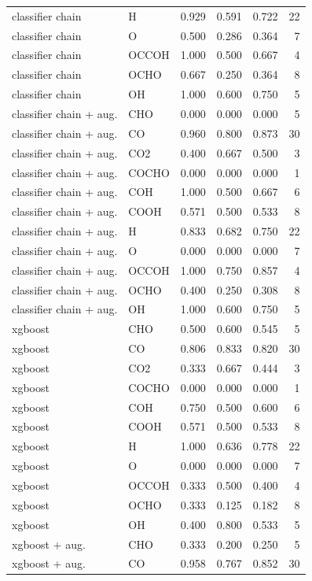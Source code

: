\begin{longtable}{llrrrr}
classifier chain & H & 0.929 & 0.591 & 0.722 & 22\\
classifier chain & O & 0.500 & 0.286 & 0.364 & 7\\
classifier chain & OCCOH & 1.000 & 0.500 & 0.667 & 4\\
classifier chain & OCHO & 0.667 & 0.250 & 0.364 & 8\\
classifier chain & OH & 1.000 & 0.600 & 0.750 & 5\\
classifier chain + aug. & CHO & 0.000 & 0.000 & 0.000 & 5\\
classifier chain + aug. & CO & 0.960 & 0.800 & 0.873 & 30\\
classifier chain + aug. & CO2 & 0.400 & 0.667 & 0.500 & 3\\
classifier chain + aug. & COCHO & 0.000 & 0.000 & 0.000 & 1\\
classifier chain + aug. & COH & 1.000 & 0.500 & 0.667 & 6\\
classifier chain + aug. & COOH & 0.571 & 0.500 & 0.533 & 8\\
classifier chain + aug. & H & 0.833 & 0.682 & 0.750 & 22\\
classifier chain + aug. & O & 0.000 & 0.000 & 0.000 & 7\\
classifier chain + aug. & OCCOH & 1.000 & 0.750 & 0.857 & 4\\
classifier chain + aug. & OCHO & 0.400 & 0.250 & 0.308 & 8\\
classifier chain + aug. & OH & 1.000 & 0.600 & 0.750 & 5\\
xgboost & CHO & 0.500 & 0.600 & 0.545 & 5\\
xgboost & CO & 0.806 & 0.833 & 0.820 & 30\\
xgboost & CO2 & 0.333 & 0.667 & 0.444 & 3\\
xgboost & COCHO & 0.000 & 0.000 & 0.000 & 1\\
xgboost & COH & 0.750 & 0.500 & 0.600 & 6\\
xgboost & COOH & 0.571 & 0.500 & 0.533 & 8\\
xgboost & H & 1.000 & 0.636 & 0.778 & 22\\
xgboost & O & 0.000 & 0.000 & 0.000 & 7\\
xgboost & OCCOH & 0.333 & 0.500 & 0.400 & 4\\
xgboost & OCHO & 0.333 & 0.125 & 0.182 & 8\\
xgboost & OH & 0.400 & 0.800 & 0.533 & 5\\
xgboost + aug. & CHO & 0.333 & 0.200 & 0.250 & 5\\
xgboost + aug. & CO & 0.958 & 0.767 & 0.852 & 30\\

\end{longtable}
